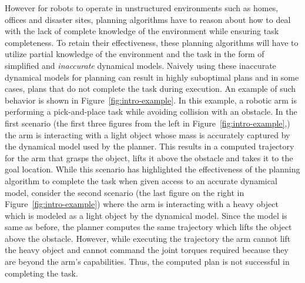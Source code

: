 However for robots to operate in unstructured environments such as
homes, offices and disaster sites, planning algorithms have to
reason about how to deal with the lack of complete knowledge of the
environment while ensuring task completeness. To retain their
effectiveness, these planning algorithms will have to utilize partial
knowledge of the environment and the task in the form of simplified
and \textit{inaccurate} dynamical models.
Naively using these inaccurate dynamical models for planning
can result in highly suboptimal plans and in some cases, plans that do
not complete the task during execution. An example of such behavior is
shown in Figure~\ref{fig:intro-example}. In this example, a robotic arm is
performing a pick-and-place task while avoiding collision with an
obstacle. In the first scenario (the first three figures from the left
in Figure~\ref{fig:intro-example},) the arm is interacting with a
light object whose mass is accurately captured by the dynamical model
used by the planner. This results in a computed trajectory for the
arm that grasps the object, lifts it above the obstacle and takes it
to the goal location. While this scenario has highlighted the
effectiveness of the planning algorithm to complete the task when
given access to an accurate dynamical model, consider the second
scenario (the last figure on the right in
Figure~\ref{fig:intro-example}) where the arm is interacting with a
heavy object which is modeled as a light object by the dynamical
model. Since the model is same as before, the planner computes the
same trajectory which lifts the object above the obstacle. However,
while executing the trajectory the arm cannot lift the heavy object and
cannot command the joint torques required because they are beyond the
arm's capabilities. Thus, the computed plan is not successful in
completing the task.
